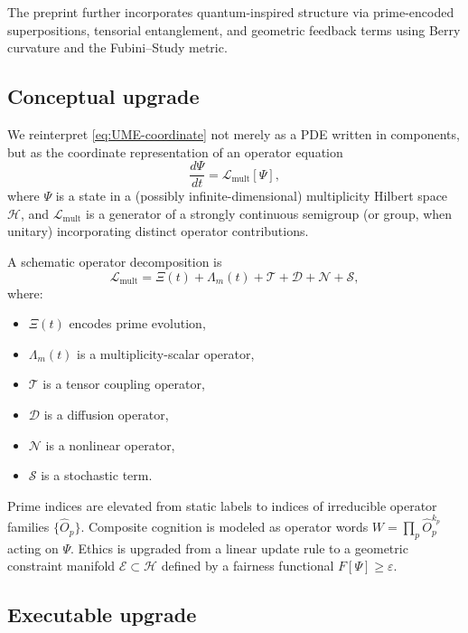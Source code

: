 \documentclass[11pt]{article}
\begin{document}
The preprint further incorporates quantum-inspired structure via prime-encoded superpositions, tensorial entanglement, and geometric feedback terms using Berry curvature and the Fubini--Study metric.

\subsection{Conceptual upgrade}

We reinterpret \eqref{eq:UME-coordinate} not merely as a PDE written in components, but as the coordinate representation of an operator equation
\begin{equation}
\frac{d\Psi}{dt} = \mathcal{L}_{\mathrm{mult}}[\Psi],
\end{equation}
where $\Psi$ is a state in a (possibly infinite-dimensional) multiplicity Hilbert space $\mathcal{H}$, and $\mathcal{L}_{\mathrm{mult}}$ is a generator of a strongly continuous semigroup (or group, when unitary) incorporating distinct operator contributions.

A schematic operator decomposition is
\begin{equation}
\mathcal{L}_{\mathrm{mult}}
=
\Xi(t) + \Lambda_m(t) + \mathcal{T} + \mathcal{D} + \mathcal{N} + \mathcal{S},
\end{equation}
where:
\begin{itemize}[nosep]
\item $\Xi(t)$ encodes prime evolution,
\item $\Lambda_m(t)$ is a multiplicity-scalar operator,
\item $\mathcal{T}$ is a tensor coupling operator,
\item $\mathcal{D}$ is a diffusion operator,
\item $\mathcal{N}$ is a nonlinear operator,
\item $\mathcal{S}$ is a stochastic term.
\end{itemize}

Prime indices are elevated from static labels to indices of irreducible operator families $\{\hat{O}_p\}$. Composite cognition is modeled as operator words $W = \prod_p \hat{O}_p^{k_p}$ acting on $\Psi$. Ethics is upgraded from a linear update rule to a geometric constraint manifold $\mathcal{E}\subset\mathcal{H}$ defined by a fairness functional $F[\Psi]\ge \varepsilon$.

\subsection{Executable upgrade}
\end{document}
